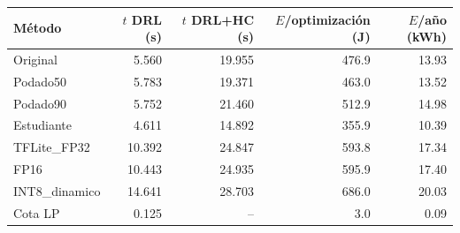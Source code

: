 \begin{tabular}{lrrrr}
\toprule
M\'etodo & $t$ DRL (s) & $t$ DRL+HC (s) & $E$/optimizaci\'on (J) & $E$/a\~no (kWh) \\
\midrule
Original & 5.560 & 19.955 & 476.9 & 13.93 \\
Podado50 & 5.783 & 19.371 & 463.0 & 13.52 \\
Podado90 & 5.752 & 21.460 & 512.9 & 14.98 \\
Estudiante & 4.611 & 14.892 & 355.9 & 10.39 \\
TFLite_FP32 & 10.392 & 24.847 & 593.8 & 17.34 \\
FP16 & 10.443 & 24.935 & 595.9 & 17.40 \\
INT8_dinamico & 14.641 & 28.703 & 686.0 & 20.03 \\
Cota LP & 0.125 & -- & 3.0 & 0.09 \\
\bottomrule
\end{tabular}